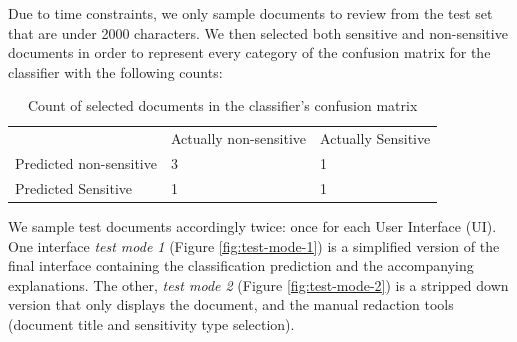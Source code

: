 \documentclass{l4proj}
\begin{document}
Due to time constraints, we only sample documents to review from the test set that are under 2000 characters.
We then selected both sensitive and non-sensitive documents in order to represent every category of the confusion matrix for the classifier with the following counts:

\begin{table}[H]
    \begin{tabular}{l ll}
                                & Actually non-sensitive & Actually Sensitive \\
        Predicted non-sensitive & 3                      & 1                  \\
        Predicted Sensitive     & 1                      & 1
    \end{tabular}
    \caption{Count of selected documents in the classifier's confusion matrix}
    \label{tab:confusion-matrix-selection}
\end{table}

We sample test documents accordingly twice: once for each User Interface (UI).
One interface \textit{test mode 1} (Figure \ref{fig:test-mode-1}) is a simplified version of the final interface containing the classification prediction and the accompanying explanations.
The other, \textit{test mode 2} (Figure \ref{fig:test-mode-2}) is a stripped down version that only displays the document, and the manual redaction tools (document title and sensitivity type selection).
\end{document}
